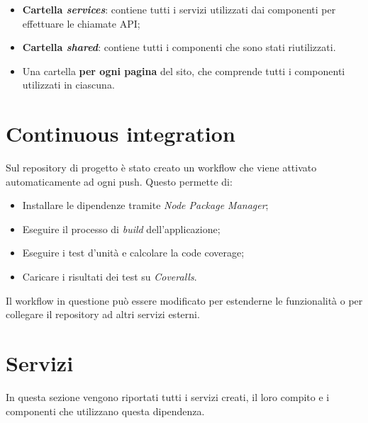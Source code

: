 \documentclass[11pt]{article}
\begin{document}
\begin{itemize}
\begin{itemize}
            \item \textbf{Cartella \textit{services}}: contiene tutti i servizi utilizzati dai componenti per effettuare le chiamate API;
            
            \item \textbf{Cartella \textit{shared}}: contiene tutti i componenti che sono stati riutilizzati.
            
            \item Una cartella \textbf{per ogni pagina} del sito, che comprende tutti i componenti utilizzati in ciascuna.
        \end{itemize}
\end{itemize}

\section{Continuous integration}
Sul repository di progetto è stato creato un workflow che viene attivato automaticamente ad ogni push. Questo permette di:
\begin{itemize}
\item Installare le dipendenze tramite \textit{Node Package Manager};
\item Eseguire il processo di \textit{build} dell’applicazione;
\item Eseguire i test d’unità e calcolare la code coverage;
\item Caricare i risultati dei test su \textit{Coveralls}.
\end{itemize}
Il workflow in questione può essere modificato per estenderne le funzionalità o per collegare il repository ad altri servizi esterni.

\section{Servizi}
In questa sezione vengono riportati tutti i servizi creati, il loro compito e i componenti che utilizzano questa dipendenza.
\end{document}
